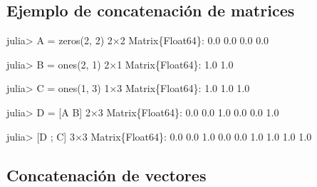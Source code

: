\documentclass[
  letterpaper,
  DIV=11,
  numbers=noendperiod]{scrreprt}
\newenvironment{Shaded}{\begin{snugshade}}{\end{snugshade}}
\newcommand{\DataTypeTok}[1]{\textcolor[rgb]{0.68,0.00,0.00}{#1}}
\newcommand{\FloatTok}[1]{\textcolor[rgb]{0.68,0.00,0.00}{#1}}
\newcommand{\FunctionTok}[1]{\textcolor[rgb]{0.28,0.35,0.67}{#1}}
\newcommand{\NormalTok}[1]{\textcolor[rgb]{0.00,0.23,0.31}{#1}}
\newcommand{\OperatorTok}[1]{\textcolor[rgb]{0.37,0.37,0.37}{#1}}
\begin{document}
\hypertarget{ejemplo-de-concatenaciuxf3n-de-matrices}{%
\subsection{Ejemplo de concatenación de
matrices}\label{ejemplo-de-concatenaciuxf3n-de-matrices}}

\begin{Shaded}
\begin{Highlighting}[]
\NormalTok{julia}\OperatorTok{\textgreater{}}\NormalTok{ A }\OperatorTok{=} \FunctionTok{zeros}\NormalTok{(}\FloatTok{2}\NormalTok{, }\FloatTok{2}\NormalTok{)}
\FloatTok{2}\OperatorTok{×}\FloatTok{2} \DataTypeTok{Matrix}\NormalTok{\{}\DataTypeTok{Float64}\NormalTok{\}}\OperatorTok{:}
 \FloatTok{0.0}  \FloatTok{0.0}
 \FloatTok{0.0}  \FloatTok{0.0}

\NormalTok{julia}\OperatorTok{\textgreater{}}\NormalTok{ B }\OperatorTok{=} \FunctionTok{ones}\NormalTok{(}\FloatTok{2}\NormalTok{, }\FloatTok{1}\NormalTok{)}
\FloatTok{2}\OperatorTok{×}\FloatTok{1} \DataTypeTok{Matrix}\NormalTok{\{}\DataTypeTok{Float64}\NormalTok{\}}\OperatorTok{:}
 \FloatTok{1.0}
 \FloatTok{1.0}

\NormalTok{julia}\OperatorTok{\textgreater{}}\NormalTok{ C }\OperatorTok{=} \FunctionTok{ones}\NormalTok{(}\FloatTok{1}\NormalTok{, }\FloatTok{3}\NormalTok{)}
\FloatTok{1}\OperatorTok{×}\FloatTok{3} \DataTypeTok{Matrix}\NormalTok{\{}\DataTypeTok{Float64}\NormalTok{\}}\OperatorTok{:}
 \FloatTok{1.0}  \FloatTok{1.0}  \FloatTok{1.0}

\NormalTok{julia}\OperatorTok{\textgreater{}}\NormalTok{ D }\OperatorTok{=}\NormalTok{ [A B]}
\FloatTok{2}\OperatorTok{×}\FloatTok{3} \DataTypeTok{Matrix}\NormalTok{\{}\DataTypeTok{Float64}\NormalTok{\}}\OperatorTok{:}
 \FloatTok{0.0}  \FloatTok{0.0}  \FloatTok{1.0}
 \FloatTok{0.0}  \FloatTok{0.0}  \FloatTok{1.0}

\NormalTok{julia}\OperatorTok{\textgreater{}}\NormalTok{ [D ; C]}
\FloatTok{3}\OperatorTok{×}\FloatTok{3} \DataTypeTok{Matrix}\NormalTok{\{}\DataTypeTok{Float64}\NormalTok{\}}\OperatorTok{:}
 \FloatTok{0.0}  \FloatTok{0.0}  \FloatTok{1.0}
 \FloatTok{0.0}  \FloatTok{0.0}  \FloatTok{1.0}
 \FloatTok{1.0}  \FloatTok{1.0}  \FloatTok{1.0}
\end{Highlighting}
\end{Shaded}

\hypertarget{concatenaciuxf3n-de-vectores}{%
\subsection{Concatenación de
vectores}\label{concatenaciuxf3n-de-vectores}}
\end{document}

